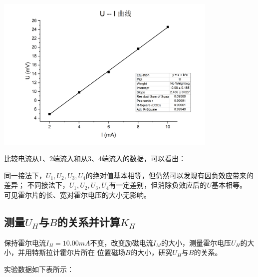 \documentclass{article}
\begin{document}
    \begin{center}
        \includegraphics[width=0.8\textwidth]{U-I curve2.jpg}
    \end{center}

    比较电流从1、2端流入和从3、4端流入的数据，可以看出：

    同一接法下，$U_1,U_2,U_3,U_4$的绝对值基本相等，但仍然可以发现有因负效应带来的差异；
    不同接法下，$U_1,U_2,U_3,U_4$有一定差别，但消除负效应后的$U$基本相等。
    可见霍尔片的长、宽对霍尔电压的大小无影响。

    \subsection{测量$U_H$与$B$的关系并计算$K_H$}
    保持霍尔电流$I_H=10.00mA$不变，改变励磁电流$I_M$的大小，测量霍尔电压$U_H$的大小，并用特斯拉计霍尔片所在
    位置磁场$B$的大小，研究$U_H$与$B$的关系。

    实验数据如下表所示：
\end{document}
